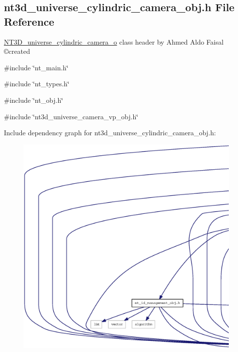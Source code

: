 \subsection{nt3d\_\-universe\_\-cylindric\_\-camera\_\-obj.h File Reference}
\label{nt3d__universe__cylindric__camera__obj_8h}



\begin{DoxyItemize}
\item \hyperlink{class_n_t3_d__universe__cylindric__camera__o}{NT3D\_\-universe\_\-cylindric\_\-camera\_\-o} class header by Ahmed Aldo Faisal \copyright created 
\end{DoxyItemize} 


{\ttfamily \#include \char`\"{}nt\_\-main.h\char`\"{}}\par
{\ttfamily \#include \char`\"{}nt\_\-types.h\char`\"{}}\par
{\ttfamily \#include \char`\"{}nt\_\-obj.h\char`\"{}}\par
{\ttfamily \#include \char`\"{}nt3d\_\-universe\_\-camera\_\-vp\_\-obj.h\char`\"{}}\par
Include dependency graph for nt3d\_\-universe\_\-cylindric\_\-camera\_\-obj.h:
\nopagebreak
\begin{figure}[H]
\begin{center}
\leavevmode
\includegraphics[width=400pt]{nt3d__universe__cylindric__camera__obj_8h__incl}
\end{center}
\end{figure}
